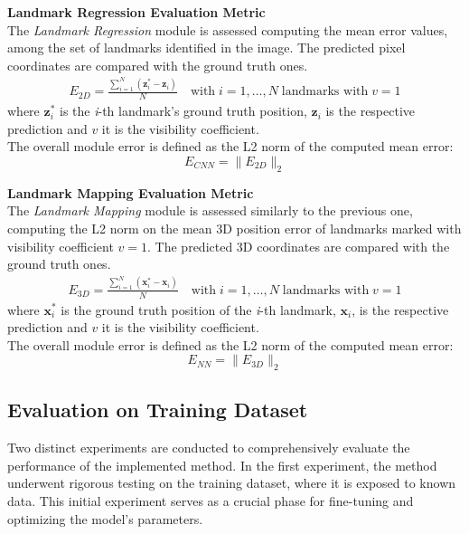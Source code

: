 \textbf{Landmark Regression Evaluation Metric}\\
The \textit{Landmark Regression} module is assessed computing the mean error values, among the set of landmarks identified in the image. The predicted pixel coordinates are compared with the ground truth ones.\\
\begin{equation}
\begin{aligned}
    E_{2D} = \frac{\sum_{i=1}^{N} (\textbf{z}^{*}_{i}-\textbf{z}_i)}{N} \quad \text{with} \; i=1,\dots,N \; \text{landmarks with} \; v=1
\end{aligned}
\end{equation}
where $\textbf{z}_{i}^{*}$ is the \textit{i}-th landmark's ground truth position, $\textbf{z}_{i}$ is the respective prediction and $v$ it is the visibility coefficient.\\
The overall module error is defined as the L2 norm of the computed mean error:
\begin{equation}
    E_{CNN} = \|E_{2D}\|_2
\end{equation}

\textbf{Landmark Mapping Evaluation Metric}\\
The \textit{Landmark Mapping} module is assessed similarly to the previous one, computing the L2 norm on the mean 3D position error of landmarks marked with visibility coefficient $v = 1$. The predicted 3D coordinates are compared with the ground truth ones.\\
\begin{equation}
\begin{aligned}
    E_{3D} = \frac{\sum_{i=1}^{N} (\textbf{x}^{*}_{i}-\textbf{x}_i)}{N} \quad \text{with} \; i=1,\dots,N \; \text{landmarks with} \; v=1
\end{aligned}
\end{equation}
where $\textbf{x}^{*}_{i}$ is the ground truth position of the \textit{i}-th landmark, $\textbf{x}_i$, is the respective prediction and $v$ it is the visibility coefficient.\\
The overall module error is defined as the L2 norm of the computed mean error:
\begin{equation}
    E_{NN} = \|E_{3D}\|_2
\end{equation}

\subsection{Evaluation on Training Dataset}
\label{Chapter5/EvalTraining}
Two distinct experiments are conducted to comprehensively evaluate the performance of the implemented method. In the first experiment, the method underwent rigorous testing on the training dataset, where it is exposed to known data. This initial experiment serves as a crucial phase for fine-tuning and optimizing the model's parameters.

